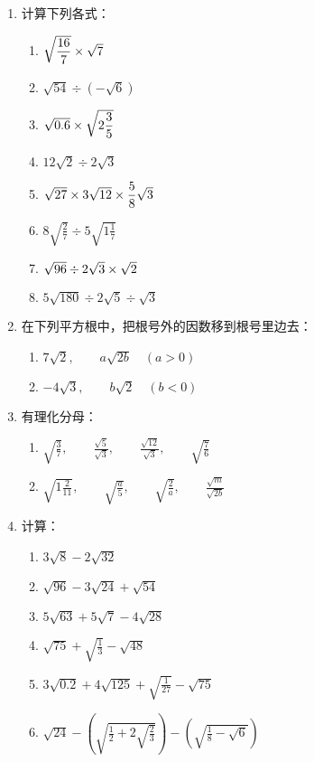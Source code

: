 \begin{enumerate}
\item 计算下列各式：
\begin{multicols}{2}
\begin{enumerate}
    \item $\sqrt{\dfrac{16}{7}}\times \sqrt{7}$
    \item $\sqrt{54}\div \left(-\sqrt{6}\right)$
    \item $\sqrt{0.6}\times \sqrt{2\dfrac{3}{5}}$
    \item $12\sqrt{2}\div 2\sqrt{3}$
    \item $\sqrt{27}\times 3\sqrt{12}\times \dfrac{5}{8}\sqrt{3}$
    \item $8\sqrt{\frac{2}{7}}\div 5\sqrt{1\frac{1}{7}}$
    \item $\sqrt{96}\div 2\sqrt{3}\times \sqrt{2}$
    \item $5\sqrt{180}\div 2\sqrt{5}\div \sqrt{3}$
\end{enumerate}
\end{multicols}

\item 在下列平方根中，把根号外的因数移到根号里边去：
\begin{enumerate}
    \item $7\sqrt{2},\qquad a\sqrt{2b}\quad (a>0)$
    \item $-4\sqrt{3},\qquad b\sqrt{2}\quad (b<0)$
\end{enumerate}

\item 有理化分母：
\begin{enumerate}
    \item $\sqrt{\frac{3}{7}},\qquad \frac{\sqrt{5}}{\sqrt{3}},\qquad \frac{\sqrt{12}}{\sqrt{3}},\qquad \sqrt{\frac{7}{6}}$
    \item $\sqrt{1\frac{2}{11}},\qquad \sqrt{\frac{a}{5}},\qquad \sqrt{\frac{2}{a}},\qquad \frac{\sqrt{m}}{\sqrt{2b}} $
\end{enumerate}

\item 计算：
\begin{enumerate}
    \item $3\sqrt{8}-2\sqrt{32}$
    \item $\sqrt{96}-3\sqrt{24}+\sqrt{54}$
    \item $5\sqrt{63}+5\sqrt{7}-4\sqrt{28}$
    \item $\sqrt{75}+\sqrt{\frac{1}{3}}-\sqrt{48}$
    \item $3\sqrt{0.2}+4\sqrt{125}+\sqrt{\frac{1}{27}}-\sqrt{75}$
    \item $\sqrt{24}-\left(\sqrt{\frac{1}{2}+2\sqrt{\frac{2}{3}}}\right)-\left(\sqrt{\frac{1}{8}-\sqrt{6}}\right)$
\end{enumerate}


\end{enumerate}
